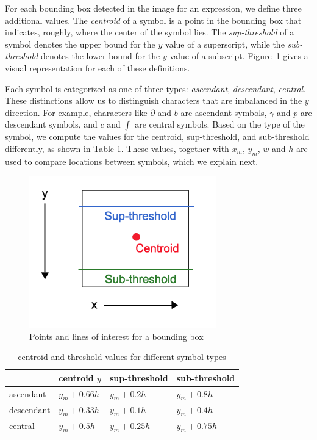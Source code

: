 \documentclass[12pt]{IEEEtran}
\begin{document}
For each bounding box detected in the image for an expression, we define three additional values. The \textit{centroid} of a symbol is a point in the bounding box that indicates, roughly, where the center of the symbol lies. The \textit{sup-threshold} of a symbol denotes the upper bound for the $y$ value of a superscript, while the \textit{sub-threshold} denotes the lower bound for the $y$ value of a subscript. Figure~\ref{fig:values} gives a visual representation for each of these definitions. 

Each symbol is categorized as one of three types: \textit{ascendant}, \textit{descendant}, \textit{central}. These distinctions allow us to distinguish characters that are imbalanced in the $y$ direction. For example, characters like $\partial$ and $b$ are ascendant symbols, $\gamma$ and $p$ are descendant symbols, and $c$ and $\int$ are central symbols. Based on the type of the symbol, we compute the values for the centroid, sup-threshold, and sub-threshold differently, as shown in Table \ref{tab:values}. These values, together with $x_m$, $y_m$, $w$ and $h$ are used to compare locations between symbols, which we explain next.

\begin{figure}[h]
  \centering
    \includegraphics[width=3.2in]{values.png}
  \caption{Points and lines of interest for a bounding box}
  \label{fig:values}
\end{figure}

\begin{table}[h]
  \caption{centroid and threshold values for different symbol types}
  \centering
  \begin{tabular}{l l l l}
  \hline
  & centroid $y$ & sup-threshold & sub-threshold\\
  \hline
  ascendant & $y_m + 0.66h$ & $y_m + 0.2h$ & $y_m+0.8h$\\
  descendant & $y_m+ 0.33h$ & $y_m +0.1h$ & $y_m+0.4h$\\
  central & $y_m+0.5h$ & $y_m+0.25h$ & $y_m+0.75h$\\
  \hline
  \end{tabular}
  \label{tab:values}
\end{table}
\end{document}
